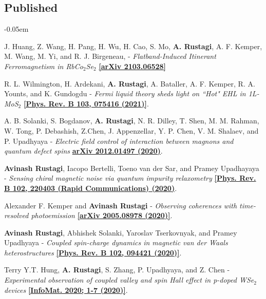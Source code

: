 \documentclass[12pt]{article}
\begin{document}
\subsection*{Published}
\begin{etaremune}
\itemsep-0.05em

\item J. Huang, Z. Wang, H. Pang, H. Wu, H. Cao, S. Mo, {\bf A. Rustagi}, A. F. Kemper, M. Wang, M. Yi, and R. J. Birgeneau,  - \textit{Flatband-Induced Itinerant Ferromagnetism in RbCo$_2$Se$_2$} \href{https://arxiv.org/abs/2103.06528}{\bf [arXiv 2103.06528]}

\item R. L. Wilmington, H. Ardekani, {\bf A. Rustagi}, A. Bataller, A. F. Kemper, R. A. Younts, and K. Gundogdu - \textit{Fermi liquid theory sheds light on ``Hot" EHL in 1L-MoS$_2$} \href{https://doi.org/10.1103/PhysRevB.103.075416}{\bf [Phys. Rev. B 103, 075416 (2021)]}.

\item A. B. Solanki, S. Bogdanov, {\bf A. Rustagi}, N. R. Dilley, T. Shen, M. M. Rahman, W. Tong, P. Debashish, Z.Chen, J. Appenzellar, Y. P. Chen, V. M. Shalaev, and P. Upadhyaya - \textit{Electric field control of interaction between magnons and quantum defect spins} \href{https://arxiv.org/abs/2012.01497}{\bf arXiv 2012.01497 (2020)}.

\item {\bf Avinash Rustagi}, Iacopo Bertelli, Toeno van der Sar, and Pramey Upadhayaya - \textit{Sensing chiral magnetic noise via quantum impurity relaxometry} \href{https://link.aps.org/doi/10.1103/PhysRevB.102.220403}{\bf [Phys. Rev. B 102, 220403 (Rapid Communications) (2020)}.

\item Alexander F. Kemper and {\bf Avinash Rustagi} - \textit{Observing coherences with time-resolved photoemission} \href{https://arxiv.org/abs/2005.08978}{\bf [arXiv 2005.08978 (2020)]}.

\item {\bf Avinash Rustagi}, Abhishek Solanki, Yaroslav Tserkovnyak, and Pramey Upadhyaya - \textit{Coupled spin-charge dynamics in magnetic van der Waals heterostructures} \href{https://link.aps.org/doi/10.1103/PhysRevB.102.094421}{\bf [Phys. Rev. B 102, 094421 (2020)]}.

\item Terry Y.T. Hung, {\bf A. Rustagi}, S. Zhang, P. Upadhyaya, and Z. Chen - \textit{Experimental observation of coupled valley and spin Hall effect in p-doped WSe$_2$ devices} \href{http://dx.doi.org/10.1002/inf2.12095} {\bf[InfoMat. 2020; 1-7 (2020)]}.


\end{etaremune}
\end{document}
